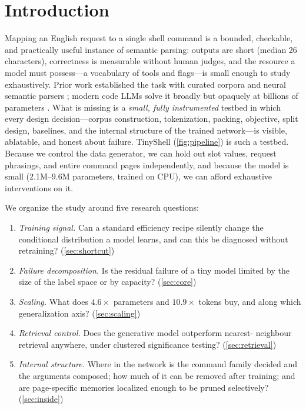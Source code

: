 \documentclass[11pt,a4paper]{article}
\newcommand{\modelname}{TinyShell}
\newcommand{\RQ}[1]{\textbf{RQ#1}}
\begin{document}
\section{Introduction}
\label{sec:intro}

Mapping an English request to a single shell command is a bounded, checkable,
and practically useful instance of semantic parsing: outputs are short (median
26 characters), correctness is measurable without human judges, and the
resource a model must possess---a vocabulary of tools and flags---is small
enough to study exhaustively. Prior work established the task with curated
corpora and neural semantic parsers \citep{lin2017tellina,lin2018nl2bash};
modern code LLMs solve it broadly but opaquely at billions of parameters
\citep{chen2021codex,roziere2023codellama}. What is missing is a \emph{small,
fully instrumented} testbed in which every design decision---corpus
construction, tokenization, packing, objective, split design, baselines, and
the internal structure of the trained network---is visible, ablatable, and
honest about failure. \modelname{} (\cref{fig:pipeline}) is such a testbed.
Because we control the data generator, we can hold out slot values, request
phrasings, and entire command pages independently, and because the model is
small (2.1M--9.6M parameters, trained on CPU), we can afford exhaustive
interventions on it.

We organize the study around five research questions:

\begin{enumerate}[label=\RQ{\arabic*}]
\item \emph{Training signal.} Can a standard efficiency recipe silently change
  the conditional distribution a model learns, and can this be diagnosed
  without retraining? (\cref{sec:shortcut})
\item \emph{Failure decomposition.} Is the residual failure of a tiny model
  limited by the size of the label space or by capacity? (\cref{sec:core})
\item \emph{Scaling.} What does $4.6\times$ parameters and $10.9\times$ tokens
  buy, and along which generalization axis? (\cref{sec:scaling})
\item \emph{Retrieval control.} Does the generative model outperform nearest-
  neighbour retrieval anywhere, under clustered significance testing?
  (\cref{sec:retrieval})
\item \emph{Internal structure.} Where in the network is the command family
  decided and the arguments composed; how much of it can be removed after
  training; and are page-specific memories localized enough to be pruned
  selectively? (\cref{sec:inside})
\end{enumerate}
\end{document}
